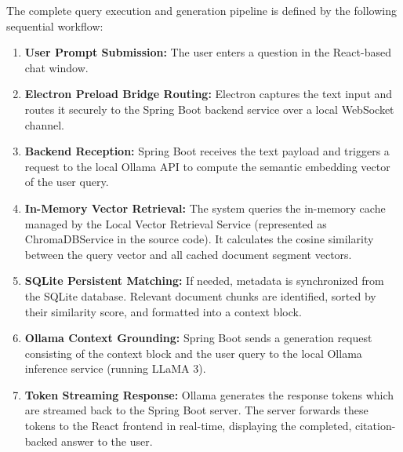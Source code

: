 \documentclass[12pt,a4paper]{report}
\begin{document}
The complete query execution and generation pipeline is defined by the following sequential workflow:
\begin{enumerate}
    \item \textbf{User Prompt Submission:} The user enters a question in the React-based chat window.
    \item \textbf{Electron Preload Bridge Routing:} Electron captures the text input and routes it securely to the Spring Boot backend service over a local WebSocket channel.
    \item \textbf{Backend Reception:} Spring Boot receives the text payload and triggers a request to the local Ollama API to compute the semantic embedding vector of the user query.
    \item \textbf{In-Memory Vector Retrieval:} The system queries the in-memory cache managed by the Local Vector Retrieval Service (represented as ChromaDBService in the source code). It calculates the cosine similarity between the query vector and all cached document segment vectors.
    \item \textbf{SQLite Persistent Matching:} If needed, metadata is synchronized from the SQLite database. Relevant document chunks are identified, sorted by their similarity score, and formatted into a context block.
    \item \textbf{Ollama Context Grounding:} Spring Boot sends a generation request consisting of the context block and the user query to the local Ollama inference service (running LLaMA 3).
    \item \textbf{Token Streaming Response:} Ollama generates the response tokens which are streamed back to the Spring Boot server. The server forwards these tokens to the React frontend in real-time, displaying the completed, citation-backed answer to the user.
\end{enumerate}
\end{document}
